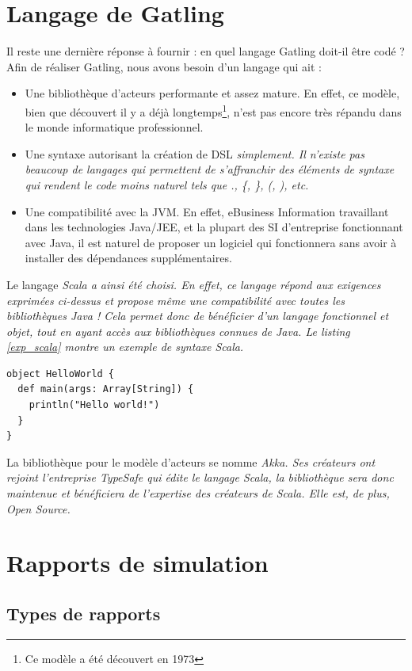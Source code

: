 \section{Langage de Gatling}
Il reste une dernière réponse à fournir : en quel langage Gatling doit-il être codé ? Afin de réaliser Gatling, nous avons besoin d'un langage qui ait :
\begin{itemize}
  \item Une bibliothèque d'acteurs performante et assez mature. En effet, ce modèle, bien que découvert il y a déjà longtemps\footnote{Ce modèle a été découvert en 1973}, n'est pas encore très répandu dans le monde informatique professionnel.
  \item Une syntaxe autorisant la création de DSL \em{simplement}. Il n'existe pas beaucoup de langages qui permettent de s'affranchir des éléments de syntaxe qui rendent le code moins naturel tels que ., \{, \}, (, ), etc.
  \item Une compatibilité avec la JVM. En effet, eBusiness Information travaillant dans les technologies Java/JEE, et la plupart des SI d'entreprise fonctionnant avec Java, il est naturel de proposer un logiciel qui fonctionnera sans avoir à installer des dépendances supplémentaires.
\end{itemize}


Le langage \em{Scala} a ainsi été choisi. En effet, ce langage répond aux exigences exprimées ci-dessus et propose même une compatibilité avec toutes les bibliothèques Java ! Cela permet donc de bénéficier d'un langage fonctionnel et objet, tout en ayant accès aux bibliothèques connues de Java. Le listing \ref{exp_scala} montre un exemple de syntaxe Scala.

\begin{lstlisting}[caption={Exemple de code Scala},label=exp_scala]
object HelloWorld {
  def main(args: Array[String]) {
    println("Hello world!")
  }
}
\end{lstlisting}

La bibliothèque pour le modèle d'acteurs se nomme \em{Akka}. Ses créateurs ont rejoint l'entreprise TypeSafe qui édite le langage Scala, la bibliothèque sera donc maintenue et bénéficiera de l'expertise des créateurs de Scala. Elle est, de plus, Open Source.

\section{Rapports de simulation}
\subsection{Types de rapports}

